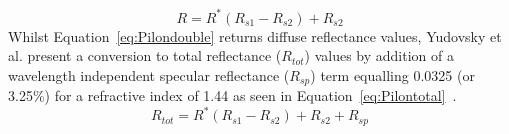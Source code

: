 \begin{equation}
    R = R^*(R_{s1} - R_{s2}) + R_{s2}
\label{eq:Pilondouble}
\end{equation}
Whilst Equation~\eqref{eq:Pilondouble} returns diffuse reflectance values, Yudovsky et al. present a conversion to total reflectance ($R_{tot}$) values by addition of a wavelength independent specular reflectance ($R_{sp}$) term equalling 0.0325 (or 3.25\%) for a refractive index of 1.44 as seen in Equation~\eqref{eq:Pilontotal}~\citep{Yudovsky2011a}.
\begin{equation}
    R_{tot} = R^*(R_{s1} - R_{s2}) + R_{s2} +R_{sp}
\label{eq:Pilontotal}
\end{equation}

